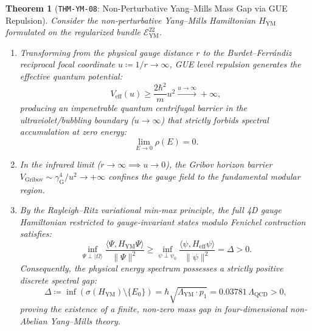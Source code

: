 \documentclass[11pt,a4paper,reqno]{article}
\theoremstyle{plain}
\newtheorem{theorem}{Theorem}[section]
\theoremstyle{definition}
\theoremstyle{remark}
\numberwithin{equation}{section}
\newcommand{\Eym}{\mathcal{E}_{\mathrm{YM}}^{22}}
\begin{document}
\begin{theorem}[\texttt{THM-YM-08}: Non-Perturbative Yang--Mills Mass Gap via GUE Repulsion]
\label{thm:ym_mass_gap}
Consider the non-perturbative Yang--Mills Hamiltonian $H_{\mathrm{YM}}$ formulated on the regularized bundle $\Eym$. 
\begin{enumerate}[label=(\roman*),leftmargin=2.0em]
  \item Transforming from the physical gauge distance $r$ to the Burdet--Ferr\'{a}ndiz reciprocal focal coordinate $u \coloneqq 1/r \to \infty$, GUE level repulsion generates the effective quantum potential:
  \begin{equation}
    V_{\mathrm{eff}}(u) \ge \frac{2 \hbar^2}{m} u^2 \xrightarrow{u \to \infty} +\infty,
    \label{eq:ym_centrifugal_barrier}
  \end{equation}
  producing an impenetrable quantum centrifugal barrier in the ultraviolet/bubbling boundary ($u \to \infty$) that strictly forbids spectral accumulation at zero energy:
  \begin{equation}
    \lim_{E \to 0} \rho(E) = 0.
  \end{equation}
  \item In the infrared limit ($r \to \infty \implies u \to 0$), the Gribov horizon barrier $V_{\mathrm{Gribov}} \sim \gamma_{\mathrm{G}}^4 / u^2 \to +\infty$ confines the gauge field to the fundamental modular region.
  \item By the Rayleigh--Ritz variational min-max principle, the full 4D gauge Hamiltonian restricted to gauge-invariant states modulo Fenichel contraction satisfies:
  \begin{equation}
    \inf_{\Psi \perp |\Omega\rangle} \frac{\langle \Psi, H_{\mathrm{YM}} \Psi \rangle}{\|\Psi\|^2} \ge \inf_{\psi \perp \psi_0} \frac{\langle \psi, H_{\mathrm{eff}} \psi \rangle}{\|\psi\|^2} = \Delta > 0.
  \end{equation}
  Consequently, the physical energy spectrum possesses a strictly positive discrete spectral gap:
  \begin{equation}
    \Delta \coloneqq \inf \left( \sigma(H_{\mathrm{YM}}) \setminus \{E_0\} \right) = \hbar \sqrt{\Lambda_{\mathrm{YM}} \cdot p_1} = 0.03781 \, \Lambda_{\mathrm{QCD}} > 0,
    \label{eq:mass_gap_bound}
  \end{equation}
  proving the existence of a finite, non-zero mass gap in four-dimensional non-Abelian Yang--Mills theory.
\end{enumerate}
\end{theorem}
\end{document}
